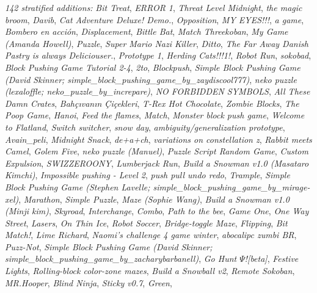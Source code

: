 \textit{142 stratified additions:}
{\footnotesize
\textit{Bit Treat}, \textit{ERROR 1}, \textit{Threat Level Midnight},
\textit{the magic broom}, \textit{Davib}, \textit{Cat Adventure
Deluxe! Demo.}, \textit{Opposition}, \textit{MY EYES!!!},
\textit{a game}, \textit{Bombero en acción}, \textit{Displacement},
\textit{Bittle Bat}, \textit{Match Threekoban}, \textit{My Game
(Amanda Howell)}, \textit{Puzzle}, \textit{Super Mario Nazi Killer},
\textit{Ditto}, \textit{The Far Away Danish Pastry is always
Deliciouser.}, \textit{Prototype 1}, \textit{Herding Cats!!!1!},
\textit{Robot Run}, \textit{sokobad}, \textit{Block Pushing Game
Tutorial 2-4}, \textit{2to}, \textit{Blockpush}, \textit{Simple Block
Pushing Game (David Skinner;
simple\_block\_pushing\_game\_by\_zaydiscool777)},
\textit{neko puzzle (lexaloffle; neko\_puzzle\_by\_increpare)},
\textit{NO FORBIDDEN SYMBOLS}, \textit{All These Damn Crates},
\textit{Bahçıvanın Çiçekleri}, \textit{T-Rex Hot Chocolate},
\textit{Zombie Blocks}, \textit{The Poop Game}, \textit{Hanoi},
\textit{Feed the flames}, \textit{Match}, \textit{Monster block push
game}, \textit{Welcome to Flatland}, \textit{Switch switcher},
\textit{snow day}, \textit{ambiguity/generalization prototype},
\textit{Avain\_peli}, \textit{Midnight Snack}, \textit{de+a+ch},
\textit{variations on constellation z}, \textit{Rabbit meets Camel},
\textit{Golem Five}, \textit{neko puzzle (Manuel)}, \textit{Puzzle
Script Random Game}, \textit{Custom Expulsion}, \textit{SWIZZEROONY},
\textit{Lumberjack Run}, \textit{Build a Snowman v1.0 (Masataro
Kimchi)}, \textit{Impossible pushing - Level 2}, \textit{push pull
undo redo}, \textit{Trample}, \textit{Simple Block Pushing Game
(Stephen Lavelle; simple\_block\_pushing\_game\_by\_mirage-xel)},
\textit{Marathon}, \textit{Simple Puzzle}, \textit{Maze (Sophie Wang)},
\textit{Build a Snowman v1.0 (Minji kim)}, \textit{Skyroad},
\textit{Interchange}, \textit{Combo}, \textit{Path to the bee},
\textit{Game One}, \textit{One Way Street}, \textit{Lasers},
\textit{On Thin Ice}, \textit{Robot Soccer}, \textit{Bridge-toggle
Maze}, \textit{Flipping}, \textit{Bit Match!}, \textit{Lime Richard},
\textit{Naomi's challenge 4 game winter}, \textit{abocalipc zumbi BR},
\textit{Puzz-Not}, \textit{Simple Block Pushing Game (David Skinner;
simple\_block\_pushing\_game\_by\_zacharybarbanell)},
\textit{Go Hunt $\Psi$\texttrademark{}![beta]}, \textit{Festive
Lights}, \textit{Rolling-block color-zone mazes}, \textit{Build a
Snowball v2}, \textit{Remote Sokoban}, \textit{MR.Hooper},
\textit{Blind Ninja}, \textit{Sticky v0.7}, \textit{Green},
}
